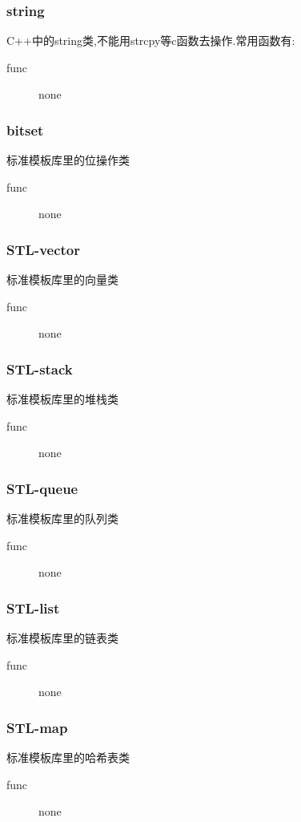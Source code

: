 \subsubsection{string}
C++中的string类,不能用strcpy等c函数去操作.常用函数有:
\begin{description}
\item[func]		none
\end{description}


\subsubsection{bitset}
标准模板库里的位操作类
\begin{description}
\item[func]		none
\end{description}


\subsubsection{STL-vector}
标准模板库里的向量类
\begin{description}
\item[func]		none
\end{description}


\subsubsection{STL-stack}
标准模板库里的堆栈类
\begin{description}
\item[func]		none
\end{description}


\subsubsection{STL-queue}
标准模板库里的队列类
\begin{description}
\item[func]		none
\end{description}


\subsubsection{STL-list}
标准模板库里的链表类
\begin{description}
\item[func]		none
\end{description}


\subsubsection{STL-map}
标准模板库里的哈希表类
\begin{description}
\item[func]		none
\end{description}


